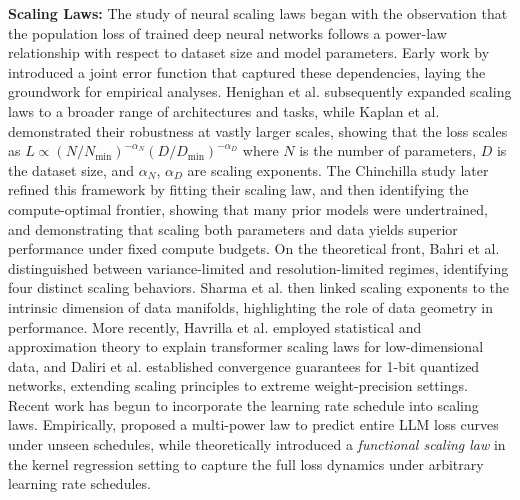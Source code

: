 \documentclass[11pt]{article}
\theoremstyle{plain}
\theoremstyle{definition}
\begin{document}
\vspace{0.1cm}
\noindent
{\bf Scaling Laws:}
The study of neural scaling laws began with the observation that the population loss of trained deep neural networks follows a power-law relationship with respect to dataset size and model parameters. Early work by \cite{rosen2020feldconstructive} introduced a joint error function that captured these dependencies, laying the groundwork for empirical analyses. Henighan et al.\citep{henighan2020scaling} subsequently expanded scaling laws to a broader range of architectures and tasks, while Kaplan et al.\citep{kaplan2020scaling} demonstrated their robustness at vastly larger scales, showing that the loss scales as $L \propto (N/N_{\text{min}})^{-\alpha_N}(D/D_{\text{min}})^{-\alpha_D}$ where \(N\) is the number of parameters, \(D\) is the dataset size, and $\alpha_N$, $\alpha_D$ are scaling exponents. The Chinchilla study \citep{hoffmann2022training} later refined this framework by fitting their scaling law, and then identifying the compute-optimal frontier, showing that many prior models were undertrained, and demonstrating that scaling both parameters and data yields superior performance under fixed compute budgets. 
On the theoretical front, Bahri et al.\citep{bahri2024explaining} distinguished between variance-limited and resolution-limited regimes, identifying four distinct scaling behaviors. Sharma et al.\citep{sharma2020neural} then linked scaling exponents to the intrinsic dimension of data manifolds, highlighting the role of data geometry in performance. 
More recently, Havrilla et al.\citep{havrilla2024understanding} employed statistical and approximation theory to explain transformer scaling laws for low-dimensional data, and Daliri et al.\citep{daliri2024unlocking} established convergence guarantees for 1-bit quantized networks, extending scaling principles to extreme weight-precision settings. 
Recent work has begun to incorporate the learning rate schedule into scaling laws. Empirically, \citep{luo2025multi} proposed a multi-power law to predict entire LLM loss curves under unseen schedules, while \citep{li2025functional} theoretically introduced a {\em functional scaling law} in the kernel regression setting to capture the full loss dynamics under arbitrary learning rate schedules.
\end{document}
